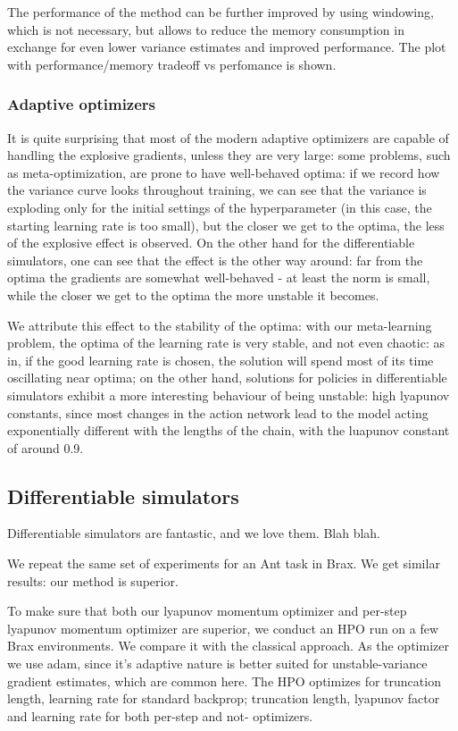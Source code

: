 \documentclass{article}
\begin{document}
The performance of the method can be further improved by using windowing, which is not necessary, but allows to reduce the memory consumption in exchange for even lower variance estimates and improved performance. The plot with performance/memory tradeoff vs perfomance is shown.

\subsubsection{Adaptive optimizers}

It is quite surprising that most of the modern adaptive optimizers are capable of handling the explosive gradients, unless they are very large: some problems, such as meta-optimization, are prone to have well-behaved optima: if we record how the variance curve looks throughout training, we can see that the variance is exploding only for the initial settings of the hyperparameter (in this case, the starting learning rate is too small), but the closer we get to the optima, the less of the explosive effect is observed. On the other hand for the differentiable simulators, one can see that the effect is the other way around: far from the optima the gradients are somewhat well-behaved - at least the norm is small, while the closer we get to the optima the more unstable it becomes.

We attribute this effect to the stability of the optima: with our meta-learning problem, the optima of the learning rate is very stable, and not even chaotic: as in, if the good learning rate is chosen, the solution will spend most of its time oscillating near optima; on the other hand, solutions for policies in differentiable simulators exhibit a more interesting behaviour of being unstable: high lyapunov constants, since most changes in the action network lead to the model acting exponentially different with the lengths of the chain, with the luapunov constant of around 0.9.

\subsection{Differentiable simulators}

Differentiable simulators are fantastic, and we love them. Blah blah.


We repeat the same set of experiments for an Ant task in Brax. We get similar results: our method is superior.

To make sure that both our lyapunov momentum optimizer and per-step lyapunov momentum optimizer are superior, we conduct an HPO run on a few Brax environments. We compare it with the classical approach. As the optimizer we use adam, since it's adaptive nature is better suited for unstable-variance gradient estimates, which are common here. The HPO optimizes for truncation length, learning rate for standard backprop; truncation length, lyapunov factor and learning rate for both per-step and not- optimizers. 
\end{document}
